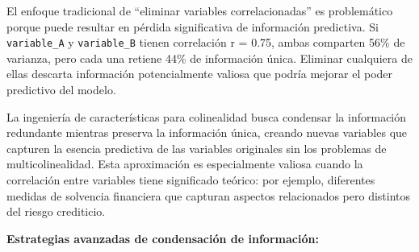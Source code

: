 \documentclass[
  letterpaper,
  DIV=11,
  numbers=noendperiod]{scrreprt}
\begin{document}
El enfoque tradicional de ``eliminar variables correlacionadas'' es
problemático porque puede resultar en pérdida significativa de
información predictiva. Si \texttt{variable\_A} y \texttt{variable\_B}
tienen correlación r = 0.75, ambas comparten 56\% de varianza, pero cada
una retiene 44\% de información única. Eliminar cualquiera de ellas
descarta información potencialmente valiosa que podría mejorar el poder
predictivo del modelo.

La ingeniería de características para colinealidad busca condensar la
información redundante mientras preserva la información única, creando
nuevas variables que capturen la esencia predictiva de las variables
originales sin los problemas de multicolinealidad. Esta aproximación es
especialmente valiosa cuando la correlación entre variables tiene
significado teórico: por ejemplo, diferentes medidas de solvencia
financiera que capturan aspectos relacionados pero distintos del riesgo
crediticio.

\textbf{Estrategias avanzadas de condensación de información:}
\end{document}
